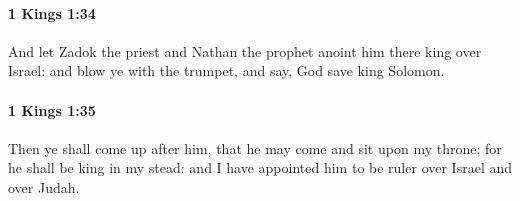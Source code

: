 		\paragraph{1 Kings 1:34} %
			\label{1KINGS-1-34}

			And let Zadok the priest and Nathan the prophet anoint him there king over Israel: and blow ye with the trumpet, and say, God save king Solomon.


		\paragraph{1 Kings 1:35} %
			\label{1KINGS-1-35}

			Then ye shall come up after him, that he may come and sit upon my throne; for he shall be king in my stead: and I have appointed him to be ruler over Israel and over Judah.


